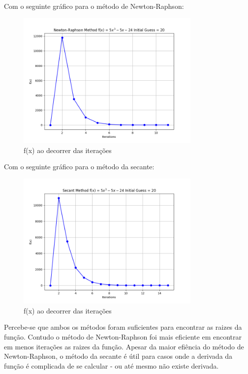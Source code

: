 \documentclass[12pt, a4paper]{article} %
\begin{document}
            Com o seguinte gr\'afico para o m\'etodo de Newton-Raphson:
            \begin{figure}[H]
                \centering
                \includegraphics[width=0.8\textwidth]{../images/grafic-ex-2.2-newton-raphson-method-20.png}
                \caption{f(x) ao decorrer das itera\c{c}\~oes}
            \end{figure}
            Com o seguinte gr\'afico para o m\'etodo da secante:
            \begin{figure}[H]
                \centering
                \includegraphics[width=0.8\textwidth]{../images/grafic-ex-2.2-secant-method-20.png}
                \caption{f(x) ao decorrer das itera\c{c}\~oes}
            \end{figure}

            Percebe-se que ambos os m\'etodos foram suficientes para encontrar as raizes da fun\c{c}\~ao. Contudo o m\'etodo de Newton-Raphson foi mais eficiente em encontrar em menos itera\c{c}\~oes as raizes da fun\c{c}\~ao.
            Apesar da maior efi\^encia do m\'etodo de Newton-Raphson, o m\'etodo da secante \'e \'util para casos onde a derivada da fun\c{c}\~ao \'e complicada de se calcular - ou at\'e mesmo n\~ao existe derivada.
\end{document}

